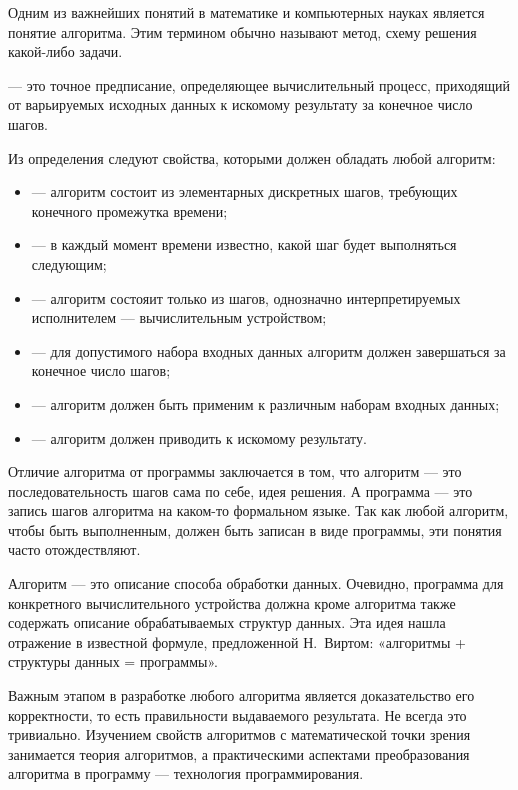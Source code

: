 Одним из важнейших понятий в математике и компьютерных науках является
понятие алгоритма. Этим термином обычно называют метод, схему решения
какой-либо задачи.

\begin{defn}
   — это точное предписание, определяющее
  вычислительный процесс, приходящий от варьируемых исходных данных к
  искомому результату за конечное число шагов.
\end{defn}

Из определения следуют свойства, которыми должен обладать любой
алгоритм:

\begin{itemize}
\item {} — алгоритм состоит из
  элементарных дискретных шагов, требующих конечного промежутка
  времени;
\item {} — в каждый
  момент времени известно, какой шаг будет выполняться следующим;
\item {} — алгоритм состояит только из
  шагов, однозначно интерпретируемых исполнителем — вычислительным
  устройством;
\item {} — для допустимого набора входных
  данных алгоритм должен завершаться за конечное число шагов;
\item {} — алгоритм должен быть
  применим к различным наборам входных данных;
\item {} — алгоритм должен
  приводить к искомому результату.
\end{itemize}

Отличие алгоритма от программы заключается в том, что алгоритм — это
последовательность шагов сама по себе, идея решения. А программа — это
запись шагов алгоритма на каком-то формальном языке. Так как любой
алгоритм, чтобы быть выполненным, должен быть записан в виде
программы, эти понятия часто отождествляют.

Алгоритм — это описание способа обработки данных. Очевидно, программа
для конкретного вычислительного устройства должна кроме алгоритма
также содержать описание обрабатываемых структур данных. Эта идея
нашла отражение в известной формуле, предложенной Н.~Виртом:
«алгоритмы + структуры данных = программы».

Важным этапом в разработке любого алгоритма является доказательство
его корректности, то есть правильности выдаваемого результата. Не
всегда это тривиально. Изучением свойств алгоритмов с математической
точки зрения занимается теория алгоритмов, а практическими аспектами
преобразования алгоритма в программу — технология программирования.

